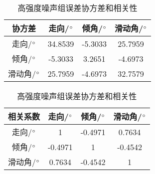 \begin{table}[ht]
\centering
\caption{高强度噪声组误差协方差和相关性}
\label{tab3_04}
    \begin{tabular}{c c c c}
    \hline
    协方差 & 走向/$^\circ$ & 倾角/$^\circ$ & 滑动角/$^\circ$ \\
    \hline
	走向/$^\circ$ 		&34.8539 	&-5.3033	&25.7959\\
	倾角/$^\circ$		&-5.3033	&3.2651		&-4.6973\\
	滑动角/$^\circ$	&25.7959	&-4.6973	&32.7579\\
    \hline
    \end{tabular}
    \begin{tabular}{c c c c}
    \hline
    相关系数 & 走向/$^\circ$ & 倾角/$^\circ$ & 滑动角/$^\circ$ \\
    \hline
	走向/$^\circ$ 		&1 			&-0.4971	&0.7634\\
	倾角/$^\circ$		&-0.4971	&1			&-0.4542\\
	滑动角/$^\circ$	&0.7634		&-0.4542		&1\\
    \hline
    \end{tabular}
\end{table}

